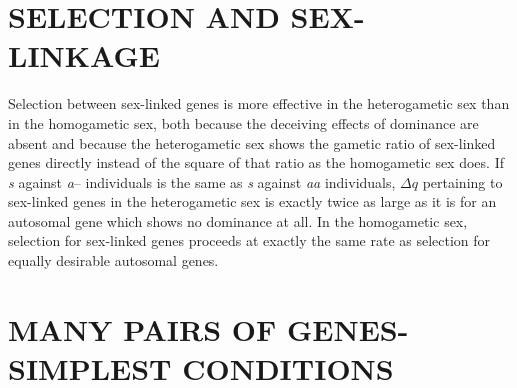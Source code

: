 \section*{SELECTION AND SEX-LINKAGE}

Selection between sex-linked genes is more effective in the heterogametic
sex than in the homogametic sex, both because the deceiving
effects of dominance are absent and because the heterogametic sex
shows the gametic ratio of sex-linked genes directly instead of the
square of that ratio as the homogametic sex does. If \textit{s} against \textit{a}-- individuals
is the same as \textit{s} against \textit{aa} individuals, $\Delta q$ pertaining to sex-linked
genes in the heterogametic sex is exactly twice as large as it is for
an autosomal gene which shows no dominance at all. In the homogametic
sex, selection for sex-linked genes proceeds at exactly the same
rate as selection for equally desirable autosomal genes.

\section*{MANY PAIRS OF GENES-SIMPLEST CONDITIONS}

